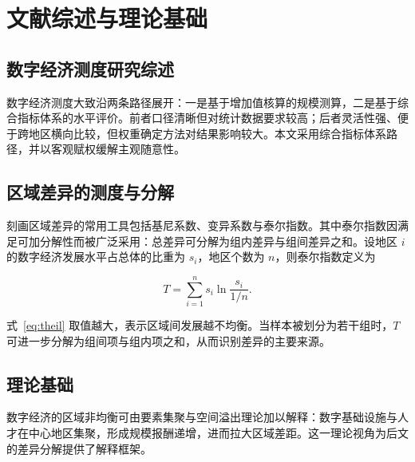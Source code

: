 \chapter{文献综述与理论基础}
\label{chap:litreview}

\section{数字经济测度研究综述}

数字经济测度大致沿两条路径展开：一是基于增加值核算的规模测算，二是基于综合指标体系的水平评价\citep{xugc2023digital}。前者口径清晰但对统计数据要求较高；后者灵活性强、便于跨地区横向比较，但权重确定方法对结果影响较大\citep{liwei2022region}。本文采用综合指标体系路径，并以客观赋权缓解主观随意性。

\section{区域差异的测度与分解}

刻画区域差异的常用工具包括基尼系数、变异系数与泰尔指数。其中泰尔指数因满足可加分解性而被广泛采用：总差异可分解为组内差异与组间差异之和。设地区 $i$ 的数字经济发展水平占总体的比重为 $s_i$，地区个数为 $n$，则泰尔指数定义为

\begin{equation}
    T = \sum_{i=1}^{n} s_i \ln\!\frac{s_i}{1/n}.
    \label{eq:theil}
\end{equation}

式~\eqref{eq:theil} 取值越大，表示区域间发展越不均衡。当样本被划分为若干组时，$T$ 可进一步分解为组间项与组内项之和，从而识别差异的主要来源。

\section{理论基础}

数字经济的区域非均衡可由要素集聚与空间溢出理论加以解释：数字基础设施与人才在中心地区集聚，形成规模报酬递增，进而拉大区域差距\citep{chen2019cluster}。这一理论视角为后文的差异分解提供了解释框架。
